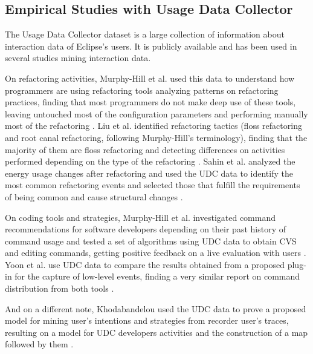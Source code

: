 \documentclass[times]{smrauth}
\begin{document}
\subsection{Empirical Studies with Usage Data Collector}
The Usage Data Collector dataset is a large collection of information about interaction data of Eclipse's users. It is publicly available and has been used in several studies mining interaction data. 

On refactoring activities, Murphy-Hill et al. used this data to understand how programmers are using refactoring tools analyzing patterns on refactoring practices, finding that most programmers do not make deep use of these tools, leaving untouched most of the configuration parameters and performing manually most of the refactoring  \cite{MPB12}. Liu et al. identified refactoring tactics (floss refactoring and root canal refactoring, following Murphy-Hill's terminology), finding that the majority of them are floss refactoring and detecting differences on activities performed depending on the type of the refactoring \cite{LGN12}. Sahin et al. analyzed the energy usage changes after refactoring and used the UDC data to identify the most common refactoring events and selected those that fulfill the requirements of being common and cause structural changes \cite{SPC14}. 

On coding tools and strategies, Murphy-Hill et al. investigated command recommendations for software developers depending on their past history of command usage and tested a set of algorithms using UDC data to obtain CVS and editing commands, getting positive feedback on a live evaluation with users \cite{MJM12}. Yoon et al. use UDC data to compare the results obtained from a proposed plug-in for the capture of low-level events, finding a very similar report on command distribution from both tools \cite{YM11}.

And on a different note, Khodabandelou used the UDC data to prove a proposed model for mining user's intentions and strategies from recorder user's traces, resulting on a model for UDC developers activities and the construction of a map followed by them \cite{KG14}.
\end{document}
